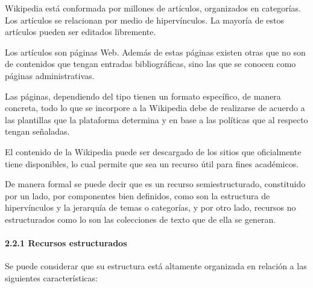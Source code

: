 \documentclass[letterpaper]{article}
\begin{document}
{\sffamily
Wikipedia est\'a conformada por millones de art\'iculos, organizados en
categor\'ias. Los art\'iculos se relacionan por medio de
hiperv\'inculos. La mayor\'ia de estos art\'iculos pueden ser editados
libremente.}


\bigskip

{\sffamily
Los art\'iculos son p\'aginas Web. Adem\'as de estas p\'aginas existen
otras que no son de contenidos que tengan entradas bibliogr\'aficas,
sino las que se conocen como p\'aginas administrativas.}


\bigskip

{\sffamily
Las p\'aginas, dependiendo del tipo tienen un formato espec\'ifico, de
manera concreta, todo lo que se incorpore a la Wikipedia debe de
realizarse de acuerdo a las plantillas que la plataforma determina y en
base a las pol\'iticas que al respecto tengan se\~naladas.}


\bigskip

{\sffamily
El contenido de la Wikipedia puede ser descargado de los sitios que
oficialmente tiene disponibles, lo cual permite que sea un recurso
\'util para fines acad\'emicos.}


\bigskip

{\sffamily
De manera formal se puede decir que es un recurso semiestructurado,
constituido por un lado, por componentes bien definidos, como son la
estructura de hiperv\'inculos y la jerarqu\'ia de temas o categor\'ias,
y por otro lado, recursos no estructurados como lo son las colecciones
de texto que de ella se generan.}


\bigskip

\paragraph{2.2.1 Recursos estructurados}

\bigskip

{\sffamily
Se puede considerar que su estructura est\'a altamente organizada en
relaci\'on a las siguientes caracter\'isticas:}


\bigskip
\end{document}
